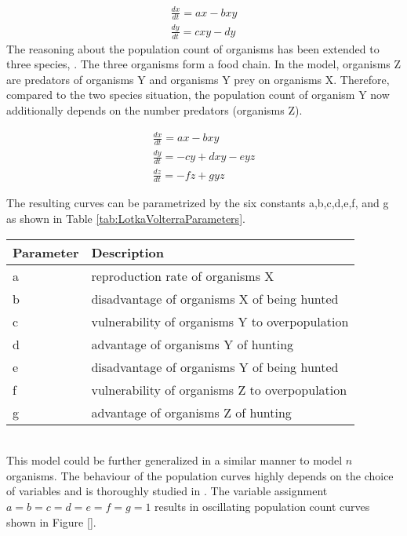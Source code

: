 \documentclass[11pt]{article}
\begin{document}
\begin{equation}
\begin{split}
\frac{dx}{dt} = ax-bxy \\ 
\frac{dy}{dt} = cxy-dy
\end{split}
\end{equation}
The reasoning about the population count of organisms has been extended to three species, \cite{lotkaVolterraThreeSpecies}. The three organisms form a food chain. In the model, organisms Z are predators of organisms Y and organisms Y prey on organisms X. Therefore, compared to the two species situation, the population count of organism Y now additionally depends on the number predators (organisms Z). 

\begin{equation}
\begin{split}
\frac{dx}{dt} = ax-bxy \\ 
\frac{dy}{dt} = -cy+dxy-eyz \\ 
\frac{dz}{dt} = -fz+gyz
\end{split}
\end{equation}

The resulting curves can be parametrized by the six constants a,b,c,d,e,f, and g as shown in Table \ref{tab:LotkaVolterraParameters}.
\\
\begin{tabular}{l|l}\label{tab:LotkaVolterraParameters}
Parameter & Description \\ 
\hline 
\hline 
a & reproduction rate of organisms X\\ 
\hline 
b & disadvantage of organisms X of being hunted\\ 
\hline 
c & vulnerability of organisms Y to overpopulation\\  
\hline 
d & advantage of organisms Y of hunting\\
\hline 
e & disadvantage of organisms Y of being hunted\\
\hline 
f & vulnerability of organisms Z to overpopulation\\
\hline 
g & advantage of organisms Z of hunting\\
\end{tabular} \\

This model could be further generalized in a similar manner to model $n$ organisms. The behaviour of the population curves highly depends on the choice of variables and is thoroughly studied in \cite{lotkaVolterraThreeSpecies}. The variable assignment $a=b=c=d=e=f=g=1$ results in oscillating population count curves shown in Figure \ref{}. 
\end{document}
